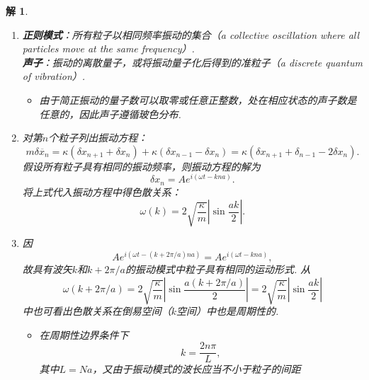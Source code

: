 \documentclass[UTF8,10pt,a4paper]{article}
\theoremstyle{Problem}
\theoremstyle{Solution}
\newtheorem*{sol}{解}
\providecommand{\abs}[1]{\left\lvert#1\right\rvert}
\begin{document}
\begin{sol}
    \begin{enumerate}
        \item[(a)] \textbf{正则模式}：所有粒子以相同频率振动的集合（a collective oscillation where all particles move at the same frequency）.\\
        \textbf{声子}：振动的离散量子，或将振动量子化后得到的准粒子（a discrete quantum of vibration）.
        \begin{itemize}
            \item[$\triangleright$] 由于简正振动的量子数可以取零或任意正整数，处在相应状态的声子数是任意的，因此声子遵循玻色分布.
        \end{itemize}
        \item[(b)] 对第$n$个粒子列出振动方程：
        \begin{equation}
            m\delta\ddot{x_n}=\kappa(\delta x_{n+1}+\delta x_{n})+\kappa(\delta x_{n-1}-\delta x_n)=\kappa(\delta x_{n+1}+\delta_{n-1}-2\delta x_n).
        \end{equation}
        假设所有粒子具有相同的振动频率，则振动方程的解为
        \begin{equation}
            \delta x_n=Ae^{i(\omega t-kna)}.
        \end{equation}
        将上式代入振动方程中得色散关系：
        \begin{equation}
            \omega(k)=2\sqrt{\frac{\kappa}{m}}\abs{\sin\frac{ak}{2}}.
        \end{equation}
        \item[(c)] 因
        \begin{equation}
            Ae^{i(\omega t-(k+2\pi/a)na)}=Ae^{i(\omega t-kna)},
        \end{equation}
        故具有波矢$k$和$k+2\pi/a$的振动模式中粒子具有相同的运动形式. 从
        \begin{equation}
            \omega(k+2\pi/a)=2\sqrt{\frac{\kappa}{m}}\abs{\sin\frac{a(k+2\pi/a)}{2}}=2\sqrt{\frac{\kappa}{m}}\abs{\sin\frac{ak}{2}}
        \end{equation}
        中也可看出色散关系在倒易空间（$k$空间）中也是周期性的.
        \begin{itemize}
            \item[$\triangleright$] 在周期性边界条件下
            \begin{equation}
                k=\frac{2n\pi}{L},
            \end{equation}
            其中$L=Na$，又由于振动模式的波长应当不小于粒子的间距

\end{itemize}
\end{enumerate}
\end{sol}
\end{document}
